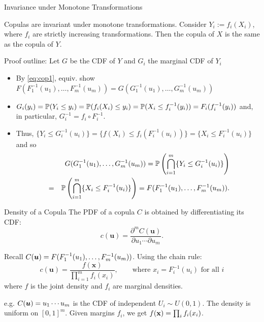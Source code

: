 \documentclass[11pt,handout,aspectratio=169]{beamer}
\begin{document}
\begin{frame}{Invariance under Monotone Transformations}
\begin{alertblock}{Copulas are invariant under monotone transformations. }
	Consider $Y_i := f_i(X_i)$, where $f_i$ are strictly increasing transformations. Then the copula of $X$ is the same as the copula of $Y$. 
\end{alertblock}
Proof outline: Let $G$ be the CDF of $Y$ and $G_i$ the marginal CDF of $Y_i$
    \begin{itemize}
    \item By \eqref{eq:cop1}, equiv. show $F(F_1^{-1}(u_1), \ldots, F_m^{-1}(u_m))=G(G_1^{-1}(u_1), \ldots, G_m^{-1}(u_m))$
        \item $G_i(y_i)=\P(Y_i\leq y_i)=\P(f_i(X_i)\leq y_i)=\P(X_i\leq f_i^{-1}(y_i))=F_i(f_i^{-1}(y_i))$ and, in particular, $G_i^{-1}=f_i\circ F_i^{-1}$.
        \item Thus, $\{Y_i\leq G_i^{-1}(u_i)\}=\{f(X_i)\leq f_i(F^{-1}_i(u_i))\}=\{X_i\leq F^{-1}_i(u_i)\}$ and so  
      \begin{eqnarray*}
      	&&G(G_1^{-1}(u_1),\ldots, G_m^{-1}(u_m))= \P\left(\bigcap_{i=1}^m \{Y_i\leq G^{-1}_i(u_i)\}\right)\\
      	&=&\P\left(\bigcap_{i=1}^m \{X_i\leq F^{-1}_i(u_i)\}\right)=F(F_1^{-1}(u_1), \ldots, F_m^{-1}(u_m)).
      \end{eqnarray*} 
    \end{itemize}
\end{frame}

\begin{frame}{Density of a Copula}
The PDF of a copula $C$ is obtained by differentiating its CDF:
    \[ c(\mathbf{u}) = \frac{\partial^m C(\mathbf{u})}{\partial u_1 \cdots \partial u_m}. \]
    
    Recall $C(\bs u)=F(F_1^{-1}(u_1),\ldots, F_m^{-1}(u_m))$. Using the chain rule:
    \[ c(\mathbf{u}) = \frac{f(\mathbf{x})}{\prod_{i=1}^m f_i(x_i)},\qquad \mbox{where } x_i=F_i^{-1}(u_i)\mbox{ for all }i \]
    where $f$ is the joint density and $f_i$ are marginal densities.
    \bigskip
    
    e.g. $C(\bs u)=u_1\cdots u_m$ is the CDF of independent $U_i\sim U(0,1)$. The density is uniform on $[0,1]^m$. Given margins $f_i$, we get $f(\x)=\prod_i f_i(x_i)$.
\end{frame}
\end{document}
